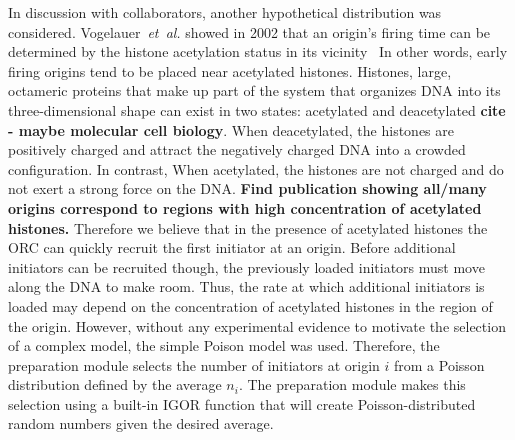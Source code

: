 		In discussion with collaborators, another hypothetical distribution was considered.
		Vogelauer~\emph{et~al.} showed in 2002 that an origin's firing time can be determined by the histone acetylation status in its vicinity~\cite{Histones}
		In other words, early firing origins tend to be placed near acetylated histones.
		Histones, large, octameric proteins that make up part of the system that organizes DNA into its three-dimensional shape can exist in two states: acetylated and deacetylated \textbf{cite - maybe molecular cell biology}.
		When deacetylated, the histones are positively charged and attract the negatively charged DNA into a crowded configuration.
		In contrast, When acetylated, the histones are not charged and do not exert a strong force on the DNA.
		\textbf{Find publication showing all/many origins correspond to regions with high concentration of acetylated histones.}
		Therefore we believe that in the presence of acetylated histones the ORC can quickly recruit the first initiator at an origin.
		Before additional initiators can be recruited though, the previously loaded initiators must move along the DNA to make room.
		Thus, the rate at which additional initiators is loaded may depend on the concentration of acetylated histones in the region of the origin.
		However, without any experimental evidence to motivate the selection of a complex model, the simple Poison model was used.
		Therefore, the preparation module selects the number of initiators at origin $i$ from a Poisson distribution defined by the average $n_i$.
		The preparation module makes this selection using a built-in IGOR function that will create Poisson-distributed random numbers given the desired average.
		

